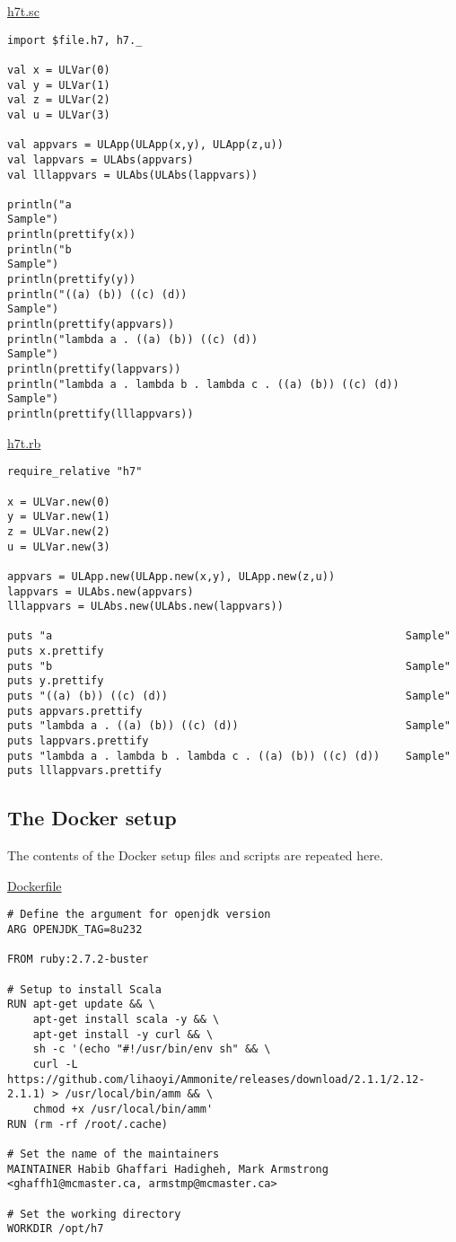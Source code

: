\documentclass[11pt]{article}
\begin{document}
\href{./testing/h7/h7t.sc}{h7t.sc}
\begin{verbatim}
import $file.h7, h7._

val x = ULVar(0)
val y = ULVar(1)
val z = ULVar(2)
val u = ULVar(3)

val appvars = ULApp(ULApp(x,y), ULApp(z,u))
val lappvars = ULAbs(appvars)
val lllappvars = ULAbs(ULAbs(lappvars))

println("a                                                       Sample")
println(prettify(x))
println("b                                                       Sample")
println(prettify(y))
println("((a) (b)) ((c) (d))                                     Sample")
println(prettify(appvars))
println("lambda a . ((a) (b)) ((c) (d))                          Sample")
println(prettify(lappvars))
println("lambda a . lambda b . lambda c . ((a) (b)) ((c) (d))    Sample")
println(prettify(lllappvars))
\end{verbatim}

\href{./testing/h7/h7t.rb}{h7t.rb}
\begin{verbatim}
require_relative "h7"

x = ULVar.new(0)
y = ULVar.new(1)
z = ULVar.new(2)
u = ULVar.new(3)

appvars = ULApp.new(ULApp.new(x,y), ULApp.new(z,u))
lappvars = ULAbs.new(appvars)
lllappvars = ULAbs.new(ULAbs.new(lappvars))

puts "a                                                       Sample"
puts x.prettify
puts "b                                                       Sample"
puts y.prettify
puts "((a) (b)) ((c) (d))                                     Sample"
puts appvars.prettify
puts "lambda a . ((a) (b)) ((c) (d))                          Sample"
puts lappvars.prettify
puts "lambda a . lambda b . lambda c . ((a) (b)) ((c) (d))    Sample"
puts lllappvars.prettify
\end{verbatim}

\subsection*{The Docker setup}
\label{sec:orgcc7f258}
The contents of the Docker setup files and scripts are repeated here.

\href{./testing/h7/Dockerfile}{Dockerfile}
\begin{verbatim}
# Define the argument for openjdk version
ARG OPENJDK_TAG=8u232

FROM ruby:2.7.2-buster

# Setup to install Scala
RUN apt-get update && \
    apt-get install scala -y && \
    apt-get install -y curl && \
    sh -c '(echo "#!/usr/bin/env sh" && \
    curl -L https://github.com/lihaoyi/Ammonite/releases/download/2.1.1/2.12-2.1.1) > /usr/local/bin/amm && \
    chmod +x /usr/local/bin/amm'
RUN (rm -rf /root/.cache)
     
# Set the name of the maintainers
MAINTAINER Habib Ghaffari Hadigheh, Mark Armstrong <ghaffh1@mcmaster.ca, armstmp@mcmaster.ca>

# Set the working directory
WORKDIR /opt/h7
\end{verbatim}
\end{document}
